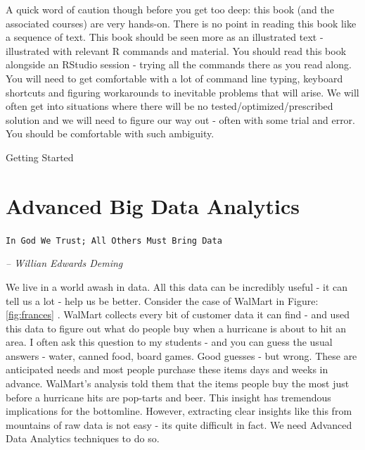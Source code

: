 \documentclass[11pt, letterpaper, twoside]{memoir}\usepackage{knitr}
\makeatletter
\newcommand{\chapterendsymbol}{
    \vspace{24pt}
    \Huge
    \hrulefill \hspace{0.1in} \hspace{0.1in} \hrulefill
    \normalsize
    }
\renewcommand\part{%
  \if@openright
    \cleardoublepage
  \else
    \clearpage
  \fi
  \thispagestyle{empty}
  \null\vfil
  \secdef\@part\@spart
  }
\makeatother
\begin{document}
A quick word of caution though before you get too deep: this book (and the associated courses) are very hands-on. There is no point in reading this book like a sequence of text. This book should be seen more as an illustrated text - illustrated with relevant R commands and material. You should read this book alongside an RStudio session - trying all the commands there as you read along. You will need to get comfortable with a lot of command line typing, keyboard shortcuts and figuring workarounds to inevitable problems that will arise. We will often get into situations where there will be no tested/optimized/prescribed solution and we will need to figure our way out - often with some trial and error. You should be comfortable with such ambiguity.

\chapterendsymbol


\mainmatter
\pagestyle{myruled}


\part{Getting Started}




\chapter{Advanced Big Data Analytics}

\begin{flushright}
\texttt{In God We Trust; All Others Must Bring Data}

\emph{-- Willian Edwards Deming}
\end{flushright}

\vspace{12pt}

We live in a world awash in data. All this data can be incredibly useful - it can tell us a lot - help us be better. Consider the case of WalMart in Figure: \ref{fig:frances} \citep{WhatT45:online}. WalMart collects every bit of customer data it can find - and used this data to figure out what do people buy when a hurricane is about to hit an area. I often ask this question to my students - and you can guess the usual answers - water, canned food, board games. Good guesses - but wrong. These are anticipated needs and most people purchase these items days and weeks in advance. WalMart's analysis told them that the items people buy the most just before a hurricane hits are  pop-tarts and beer. This insight has tremendous implications for the bottomline. However, extracting clear insights like this from mountains of raw data is not easy - its quite difficult in fact. We need Advanced Data Analytics techniques to do so.  
\end{document}
